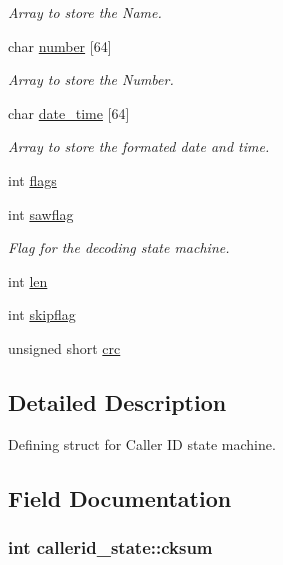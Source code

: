 \begin{DoxyCompactItemize}
\begin{DoxyCompactList}\small\item\em Array to store the Name. \end{DoxyCompactList}\item 
char \hyperlink{structcallerid__state_af7151357841b78dcfcb62e58de1cbeb2}{number} \mbox{[}64\mbox{]}
\begin{DoxyCompactList}\small\item\em Array to store the Number. \end{DoxyCompactList}\item 
char \hyperlink{structcallerid__state_a8d42244ee94ebf3e63931b2dd9f7bd82}{date\+\_\+time} \mbox{[}64\mbox{]}
\begin{DoxyCompactList}\small\item\em Array to store the formated date and time. \end{DoxyCompactList}\item 
int \hyperlink{structcallerid__state_a8282272c310e273ff345babd81adae4a}{flags}
\item 
int \hyperlink{structcallerid__state_a62086559eee5b1f234fb1fc0e742d7c4}{sawflag}
\begin{DoxyCompactList}\small\item\em Flag for the decoding state machine. \end{DoxyCompactList}\item 
int \hyperlink{structcallerid__state_a2a6a106f73258e45b760ea3e5bd2ef74}{len}
\item 
int \hyperlink{structcallerid__state_a84a4244e0f6780f44cb57ae15fa0dfe4}{skipflag}
\item 
unsigned short \hyperlink{structcallerid__state_a66aba9a925c45880b6b61a1dcc389e73}{crc}
\end{DoxyCompactItemize}


\subsection{Detailed Description}
Defining struct for Caller I\+D state machine. 

\subsection{Field Documentation}
\hypertarget{structcallerid__state_a16e10e23fac23e09c68314e4115747e4}{}
\subsubsection[{cksum}]{\setlength{\rightskip}{0pt plus 5cm}int callerid\+\_\+state\+::cksum}\label{structcallerid__state_a16e10e23fac23e09c68314e4115747e4}
\hypertarget{structcallerid__state_a66aba9a925c45880b6b61a1dcc389e73}{}
